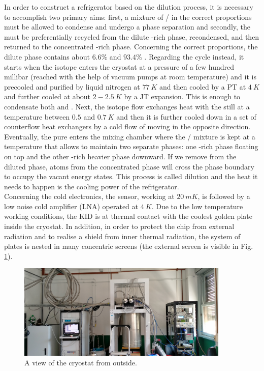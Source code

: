 \documentclass[12pt]{article}
\begin{document}
In order to construct a refrigerator based on the dilution process, it is necessary to accomplish two primary aims: first, a mixture of / in the correct proportions must be allowed to condense and undergo a phase separation and secondly, the  must be preferentially recycled from the dilute -rich phase, recondensed, and then returned to the concentrated -rich phase. Concerning the correct proportions, the dilute phase contains about $6.6 \%$  and $93.4 \%$ . Regarding the  cycle instead, it starts when the isotope enters the cryostat at a pressure of a few hundred millibar (reached with the help of vacuum pumps at room temperature) and it is precooled and purified by liquid nitrogen at $77~K$ and then cooled by a PT at $4~K$ and further cooled at about $2-2.5~K$ by a JT expansion. This is enough to condensate both  and . Next, the isotope flow exchanges heat with the still at a temperature between $0.5$ and $0.7~K$ and then it is further cooled down in a set of counterflow heat exchangers by a cold flow of  moving in the opposite direction. Eventually, the pure  enters the mixing chamber where the / mixture is kept at a temperature that allows to maintain two separate phases: one -rich phase floating on top and the other -rich heavier phase downward. If we remove  from the diluted phase,  atoms from the concentrated phase will cross the phase boundary to occupy the vacant energy states. This process is called dilution and the heat it needs to happen is the cooling power of the refrigerator.\\
Concerning the cold electronics, the sensor, working at $20~mK$, is followed by a low noise cold amplifier (LNA) operated at $4~K$. Due to the low temperature working conditions, the KID is at thermal contact with the coolest golden plate inside the cryostat. In addition, in order to protect the chip from external radiation and to realise a shield from inner thermal radiation, the system of plates is nested in many concentric screens (the external screen is visible in Fig. \ref{fig:Stanza}).
\begin{figure}[H]
\centering
\includegraphics[width=0.9\textwidth]{stanza.jpg}
\caption{\label{fig:Stanza} A view of the cryostat from outside.}
\end{figure}
\end{document}
